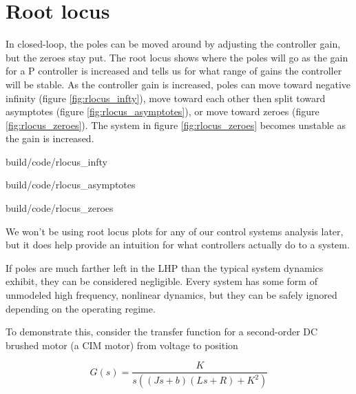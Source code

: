 \section{Root locus} \label{sec:root_locus}

In closed-loop, the poles can be moved around by adjusting the controller gain,
but the zeroes stay put. The root locus shows where the poles will go as the
gain for a P controller is increased and tells us for what range of gains the
controller will be stable. As the controller gain is increased, poles can move
toward negative infinity (figure \ref{fig:rlocus_infty}), move toward each other
then split toward asymptotes (figure \ref{fig:rlocus_asymptotes}), or move
toward zeroes (figure \ref{fig:rlocus_zeroes}). The \gls{system} in figure
\ref{fig:rlocus_zeroes} becomes unstable as the gain is increased.

\begin{bookfigure}
  \begin{minisvg}{build/code/rlocus_infty}
    \caption{Root locus showing pole moving toward negative infinity}
    \label{fig:rlocus_infty}
  \end{minisvg}
  \hfill
  \begin{minisvg}{build/code/rlocus_asymptotes}
    \caption{Root locus showing poles moving toward asymptotes}
    \label{fig:rlocus_asymptotes}
  \end{minisvg}
  \hfill
  \begin{minisvg}{build/code/rlocus_zeroes}
    \caption{Root locus of equation (\ref{eq:transfer_func}) showing poles
      moving toward zeroes.}
    \label{fig:rlocus_zeroes}
  \end{minisvg}
\end{bookfigure}

We won't be using root locus plots for any of our control systems analysis
later, but it does help provide an intuition for what \glspl{controller}
actually do to a \gls{system}.

If poles are much farther left in the LHP than the typical \gls{system} dynamics
exhibit, they can be considered negligible. Every \gls{system} has some form of
unmodeled high frequency, nonlinear dynamics, but they can be safely ignored
depending on the operating regime.

To demonstrate this, consider the transfer function for a second-order DC
brushed motor (a CIM motor) from voltage to position

\begin{equation*}
  G(s) = \frac{K}{s((Js + b)(Ls + R) + K^2)}
\end{equation*}

